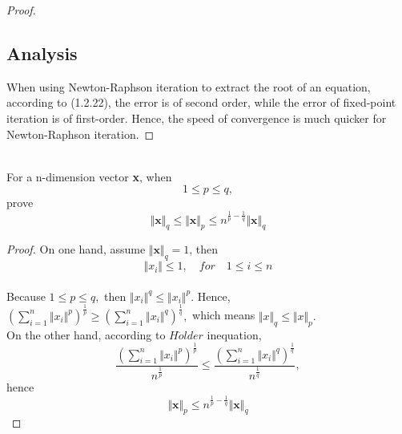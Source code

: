 \documentclass[12pt]{article}
\newenvironment{problem}[2][Problem]{\begin{trivlist}
\item[\hskip \labelsep {\bfseries #1}\hskip \labelsep {\bfseries #2.}]}{\end{trivlist}}
\begin{document}
\begin{proof}
\subsection{Analysis}
When using Newton-Raphson iteration to extract the root of an equation, according to (1.2.22), the error is of second order, while the error of fixed-point iteration is of first-order. Hence, the speed of convergence is much quicker for Newton-Raphson iteration. 

\end{proof}

\begin{problem}{2}
\text{ }\\
For a n-dimension vector \textbf{x}, when $$1\leqslant p\leqslant q,$$ prove  $$\Vert\textbf{x}\Vert_q \leqslant\Vert\textbf{x}\Vert_p\leqslant n^{\frac{1}{p}-\frac{1}{q}}\Vert\textbf{x}\Vert_q$$
\end{problem}
\begin{proof}
On one hand, assume $\Vert\textbf{x}\Vert_q = 1$, then $$\Vert x_i\Vert\leqslant 1,\quad for\quad 1\leqslant i \leqslant n$$\\
Because $1\leqslant p\leqslant q,$ then $\Vert x_{i}\Vert^{q}\leqslant\Vert x_{i}\Vert^{p}.$ Hence, $(\sum_{i=1}^{n}\Vert x_{i}\Vert^p)^\frac{1}{p}\geqslant(\sum_{i=1}^{n}\Vert x_{i}\Vert^q)^\frac{1}{q},$ which means $\Vert x\Vert_q\leqslant\Vert x\Vert_p.$\\
On the other hand, according to $H\ddot{o}lder$ inequation, $$\frac{(\sum_{i=1}^{n}\Vert x_{i}\Vert^{p})^\frac{1}{p}}{n^\frac{1}{p}} \leqslant \frac{(\sum_{i=1}^{n}\Vert x_{i}\Vert^{q})^\frac{1}{q}}{n^\frac{1}{q}},$$ hence $$\Vert\textbf{x}\Vert_p\leqslant n^{\frac{1}{p}-\frac{1}{q}}\Vert\textbf{x}\Vert_q$$
\end{proof}
\end{document}
